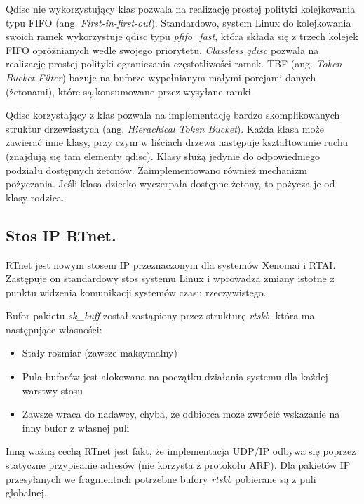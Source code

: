 Qdisc nie wykorzystujący klas pozwala na realizację prostej polityki kolejkowania typu FIFO (ang. \emph{First-in-first-out}). Standardowo, system Linux do kolejkowania swoich ramek wykorzystuje qdisc typu \emph{pfifo\_fast}, która składa się z trzech kolejek FIFO opróżnianych wedle swojego priorytetu. \emph{Classless qdisc} pozwala na realizację prostej polityki ograniczania częstotliwości ramek. TBF (ang. \emph{Token Bucket Filter}) bazuje na buforze wypełnianym małymi porcjami danych (żetonami), które są konsumowane przez wysyłane ramki.

Qdisc korzystający z klas pozwala na implementację bardzo skomplikowanych struktur drzewiastych (ang. \emph{Hierachical Token Bucket}). Każda klasa może zawierać inne klasy, przy czym w liściach drzewa następuje kształtowanie ruchu (znajdują się tam elementy qdisc). Klasy służą jedynie do odpowiedniego podziału dostępnych żetonów. Zaimplementowano również mechanizm pożyczania. Jeśli klasa dziecko wyczerpała dostępne żetony, to pożycza je od klasy rodzica.

\subsection{Stos IP RTnet.}

RTnet jest nowym stosem IP przeznaczonym dla systemów Xenomai i RTAI. Zastępuje on standardowy stos systemu Linux i wprowadza zmiany istotne z punktu widzenia komunikacji systemów czasu rzeczywistego.

Bufor pakietu \emph{sk\_buff} został zastąpiony przez strukturę \emph{rtskb}, która ma następujące własności:

\begin{itemize}
\item Stały rozmiar (zawsze maksymalny)
\item Pula buforów jest alokowana na początku działania systemu dla każdej warstwy stosu
\item Zawsze wraca do nadawcy, chyba, że odbiorca może zwrócić wskazanie na inny bufor z własnej puli
\end{itemize}

Inną ważną cechą RTnet jest fakt, że implementacja UDP/IP odbywa się poprzez statyczne przypisanie adresów (nie korzysta z protokołu ARP). Dla pakietów IP przesyłanych we fragmentach potrzebne bufory \emph{rtskb} pobierane są z puli globalnej.

